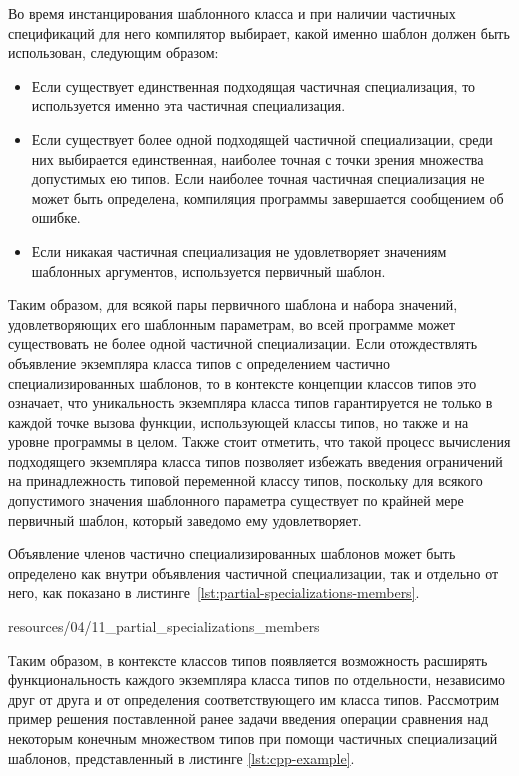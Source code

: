 Во время инстанцирования шаблонного класса и при наличии частичных спецификаций для него компилятор выбирает, какой именно шаблон должен быть использован, следующим образом:
\begin{itemize}
    \item Если существует единственная подходящая частичная специализация, то используется именно эта частичная специализация.
    \item Если существует более одной подходящей частичной специализации, среди них выбирается единственная, наиболее точная с точки зрения множества допустимых ею типов. Если наиболее точная частичная специализация не может быть определена, компиляция программы завершается сообщением об ошибке.    
    \item Если никакая частичная специализация не удовлетворяет значениям шаблонных аргументов, используется первичный шаблон.
\end{itemize}
Таким образом, для всякой пары первичного шаблона и набора значений, удовлетворяющих его шаблонным параметрам, во всей программе может существовать не более одной частичной специализации. Если отождествлять объявление экземпляра класса типов с определением частично специализированных шаблонов, то в контексте концепции классов типов это означает, что уникальность экземпляра класса типов гарантируется не только в каждой точке вызова функции, использующей классы типов, но также и на уровне программы в целом. Также стоит отметить, что такой процесс вычисления подходящего экземпляра класса типов позволяет избежать введения ограничений на принадлежность типовой переменной классу типов, поскольку для всякого допустимого значения шаблонного параметра существует по крайней мере первичный шаблон, который заведомо ему удовлетворяет. 

Объявление членов частично специализированных шаблонов может быть определено как внутри объявления частичной специализации, так и отдельно от него, как показано в листинге~\ref{lst:partial-specializations-members}. 


{resources/04/11_partial_specializations_members}

 Таким образом, в контексте классов типов появляется возможность расширять функциональность каждого экземпляра класса типов по отдельности, независимо друг от друга и от определения соответствующего им класса типов. Рассмотрим пример решения поставленной ранее задачи введения операции сравнения над некоторым конечным множеством типов при помощи частичных специализаций шаблонов, представленный в листинге \ref{lst:cpp-example}.
 
